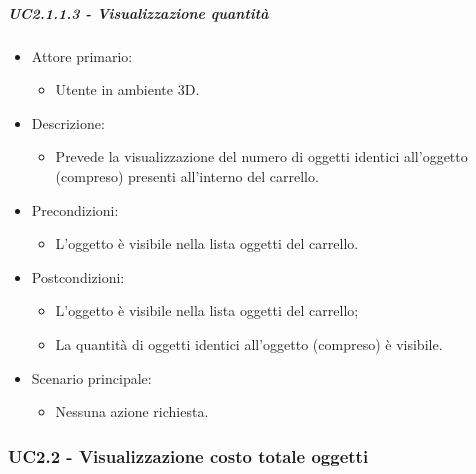 \subparagraph{UC2.1.1.3 - Visualizzazione quantità}
\begin{itemize}
	
	\item Attore primario: 
	\begin{itemize}
		\item Utente in ambiente 3D.
	\end{itemize}
	\item Descrizione:
	\begin{itemize}
		\item Prevede la visualizzazione del numero di oggetti identici all'oggetto (compreso) presenti all'interno del carrello.
	\end{itemize}
	
	\item Precondizioni:
	\begin{itemize}
		\item L'oggetto è visibile nella lista oggetti del carrello.
	\end{itemize}
	
	\item Postcondizioni:
	\begin{itemize}
		\item L'oggetto è visibile nella lista oggetti del carrello;
		\item La quantità di oggetti identici all'oggetto (compreso) è visibile.
	\end{itemize}
	
	\item Scenario principale:
	\begin{itemize}
		\item Nessuna azione richiesta.
	\end{itemize}
	
\end{itemize}

\subsubsection{UC2.2 - Visualizzazione costo totale oggetti}

